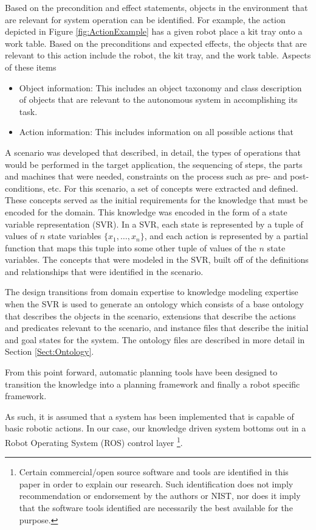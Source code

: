 Based on the precondition and effect statements, objects in the environment that are relevant 
for system operation can be identified. For example, the action depicted in Figure \ref{fig:ActionExample}
has a given robot place a kit tray onto a work table. Based on the preconditions and expected effects,
the objects that are relevant to this action include the robot, the kit tray, and the work table.
Aspects of these items


\begin{itemize}
 \item Object information: This includes an object taxonomy and class description of 
objects that are relevant to the autonomous system in accomplishing its task.
 \item Action information: This includes information on all possible actions that
\end{itemize}



A scenario 
was developed that described, in detail, the types of operations that would be performed 
in the target application, the sequencing of steps, the parts and machines that were 
needed, constraints 
on the process such as pre- and post-conditions, etc. For this scenario, a set of 
concepts were extracted and defined. These concepts served as the initial requirements 
for the knowledge that must be encoded for the domain.
This knowledge was encoded in the form of a state variable representation (SVR). 
In a SVR, each state is represented by a tuple of values of $n$ state variables 
$\lbrace x_1,\dots,x_n\rbrace$, and each action is represented by a partial function 
that maps this tuple into some other tuple of values of the $n$ state variables.
The concepts that were modeled in the SVR, built off of the 
definitions and relationships that were identified in the scenario. 

The design transitions from domain expertise to knowledge modeling expertise
when the SVR is used to generate an ontology which consists of a base ontology
that describes the objects in the scenario, extensions that describe the
actions and predicates relevant to the scenario, and instance files that
describe the initial and goal states for the system. The ontology files are
described in more detail in Section \ref{Sect:Ontology}.

From this point forward, automatic planning tools have been designed to transition 
the knowledge into a planning framework and finally a robot specific framework.

As such, it is assumed that a system has been implemented
that is capable of basic robotic actions. In our case, our knowledge
driven system bottoms out in a Robot Operating System (ROS) control layer
\footnote{Certain commercial/open source software and tools are identified 
in this paper in order to explain our research. Such identification does not imply
recommendation or endorsement by the authors or NIST, nor does it 
imply that the software tools identified are necessarily the best available for the purpose.}.
